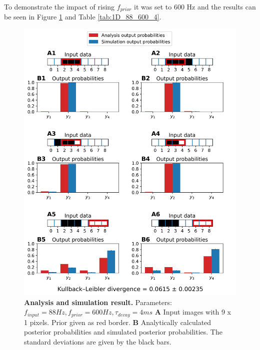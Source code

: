 To demonstrate the impact of rising $f_{prior}$ it was set to 600 Hz and the results can be seen in Figure \ref{fig:1D_88_600_4} and Table \ref{tab:1D_88_600_4}.

\begin{figure}
  \includegraphics[width=\linewidth]{figures/1D/1D_88_600_4.png}
  \caption{\textbf{Analysis and simulation result. } Parameters: $f_{input} = 88 Hz, f_{prior} = 600 Hz, \tau_{decay} = 4 ms$ \textbf{A} Input images with 9 x 1 pixels. Prior given as red border. \textbf{B} Analytically calculated posterior probabilities and simulated posterior probabilities. The standard deviations are given by the black bars.}
  \label{fig:1D_88_600_4}
\end{figure}

